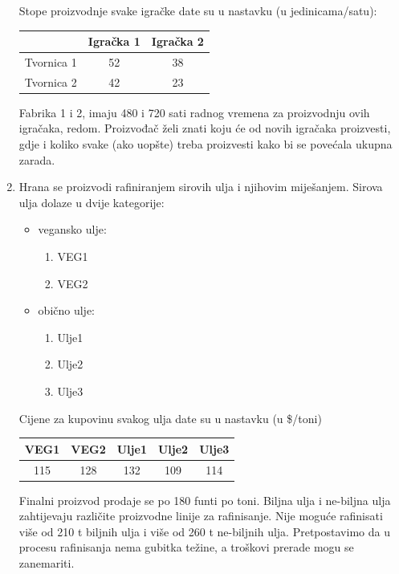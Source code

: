 \documentclass[a4paper, utf8, 11pt, colorlinks]{book}
\begin{document}
\begin{enumerate}
 
 Stope proizvodnje svake igračke date su u nastavku (u jedinicama/satu): 
  \begin{table}[H]
 	\centering
 	\begin{tabular}{l|cc}
 		         &  Igračka 1 & Igračka 2 \\ \hline
 	Tvornica 1   &  52     &  38     \\
    Tvornica 2   &  42     &  23     \\	\hline
 	\end{tabular} 
 \end{table}
 Fabrika 1 i 2, imaju 480 i 720 sati radnog vremena za proizvodnju ovih igračaka, redom. Proizvođač želi znati koju će od novih igračaka proizvesti, gdje i koliko svake (ako uopšte) treba proizvesti kako bi se povećala ukupna zarada. 
 \item %
 Hrana se proizvodi rafiniranjem sirovih ulja i njihovim miješanjem. Sirova ulja dolaze u dvije kategorije: 
 \begin{itemize}
 	\item vegansko ulje:
 	\begin{enumerate}
 		\item VEG1
 		\item VEG2 
 	\end{enumerate}
   \item obično ulje:
   \begin{enumerate}
   	\item Ulje1
   	\item Ulje2 
   	\item Ulje3
   \end{enumerate}
 \end{itemize}
Cijene za kupovinu svakog ulja date su u nastavku (u \$/toni)
\begin{table}[H]
 	\centering
 	\begin{tabular}{ccccc}
            VEG1 & VEG2 & Ulje1 & Ulje2 & Ulje3 \\ \hline
            115  & 128  & 132   & 109   & 114 \\ 		
    \end{tabular} 
\end{table}
Finalni proizvod prodaje se po 180 funti po toni. Biljna ulja i ne-biljna ulja zahtijevaju različite proizvodne linije za rafinisanje. Nije moguće rafinisati više od 210 t biljnih ulja i više od 260 t ne-biljnih ulja. Pretpostavimo da u procesu rafinisanja nema gubitka težine, a troškovi prerade mogu se zanemariti. 


\end{enumerate}
\end{document}
